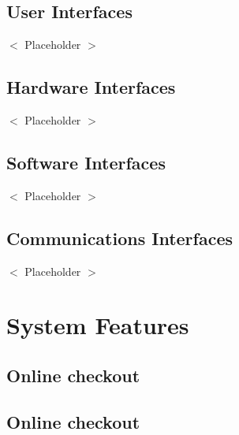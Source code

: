\documentclass{scrreprt}
\theoremstyle{funreq}
\begin{document}
\subsection{User Interfaces}
$<$ Placeholder $>$

\subsection{Hardware Interfaces}
$<$ Placeholder $>$

\subsection{Software Interfaces}
$<$ Placeholder $>$

\subsection{Communications Interfaces}
$<$ Placeholder $>$

\section{System Features}



\subsection{Online checkout}

	
	
	\subsection{Online checkout}
	
	
	
\end{document}
